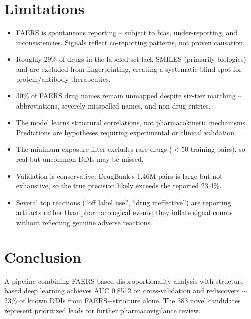 \documentclass{article}
\begin{document}
\section{Limitations}\label{sec:limitations}
\begin{itemize}\itemsep 1pt
\item FAERS is spontaneous reporting -- subject to bias, under-reporting, and inconsistencies. Signals reflect co-reporting patterns, not proven causation.
\item Roughly 29\% of drugs in the labeled set lack SMILES (primarily biologics) and are excluded from fingerprinting, creating a systematic blind spot for protein/antibody therapeutics.
\item 30\% of FAERS drug names remain unmapped despite six-tier matching -- abbreviations, severely misspelled names, and non-drug entries.
\item The model learns structural correlations, not pharmacokinetic mechanisms. Predictions are hypotheses requiring experimental or clinical validation.
\item The minimum-exposure filter excludes rare drugs ($<50$ training pairs), so real but uncommon DDIs may be missed.
\item Validation is conservative: DrugBank's 1.46M pairs is large but not exhaustive, so the true precision likely exceeds the reported 23.4\%.
\item Several top reactions (``off label use'', ``drug ineffective'') are reporting artifacts rather than pharmacological events; they inflate signal counts without reflecting genuine adverse reactions.
\end{itemize}

\section{Conclusion}\label{sec:conclusion}
A pipeline combining FAERS-based disproportionality analysis with structure-based deep learning achieves AUC 0.8512 on cross-validation and rediscovers $\sim$23\% of known DDIs from FAERS+structure alone. The 383 novel candidates represent prioritized leads for further pharmacovigilance review.



\end{document}
